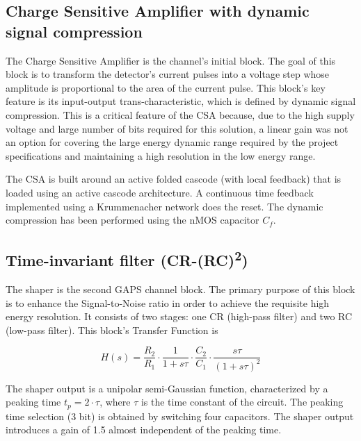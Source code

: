 
\subsection*{Charge Sensitive Amplifier with dynamic signal compression}
The Charge Sensitive Amplifier is the channel's initial block. The goal of this block is to transform the detector's current pulses into a voltage step whose amplitude is proportional to the area of the current pulse. This block's key feature is its input-output trans-characteristic, which is defined by  dynamic signal compression. This is a critical feature of the CSA because, due to the high supply voltage and large number of bits required for this solution, a linear gain was not an option for covering the large energy dynamic range required by the project specifications and maintaining a high resolution in the low energy range.

\par
The CSA is built around an active folded cascode (with local feedback) that is loaded using an active cascode architecture. A continuous time feedback implemented using a Krummenacher network does the reset. The dynamic compression has been performed using the nMOS capacitor $C_f$.


\subsection*{Time-invariant filter (CR-(RC)\textsuperscript{2})}
\label{shaper}
The shaper is the second GAPS channel block. The primary purpose of this block is to enhance the Signal-to-Noise ratio in order to achieve the requisite high energy resolution. It consists of two stages: one CR (high-pass filter) and two RC (low-pass filter). This block's Transfer Function is

\begin{equation}
    H(s) = \frac{R_2}{R_1} \cdot \frac{1}{1+s\tau} \cdot \frac{C_2}{C_1} \cdot \frac{s\tau}{(1+s\tau)^2}
\end{equation}

\noindent
The shaper output is a unipolar semi-Gaussian function, characterized by a peaking time $t_p = 2 \cdot \tau$, where $\tau$ is the time constant of the circuit. The peaking time selection (3 bit) is obtained by switching four capacitors. The shaper output introduces a gain of 1.5 almost independent of the peaking time.

